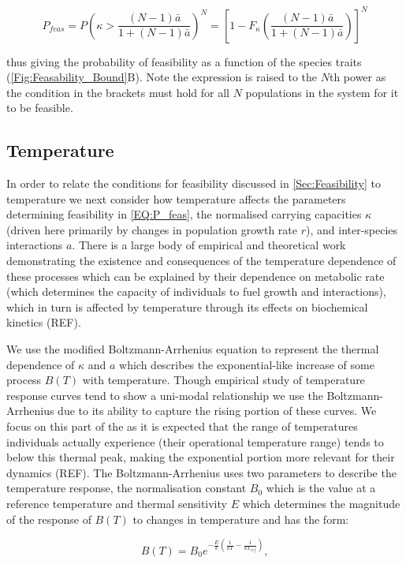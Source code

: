 \documentclass{article}
\begin{document}
\begin{equation} \label{EQ:P_feas}
    P_{feas} = P \left( \kappa > \frac{(N-1)\bar{a}}{1 + (N-1)\bar{a}}  \right)^N = 
    \left[1 - F_{\kappa}\left(\frac{(N-1)\bar{a}}{1 + (N-1)\bar{a}}\right)\right]^N
\end{equation}

thus giving the probability of feasibility as a function of the species traits (\cref{Fig:Feasability_Bound}B). Note the expression is raised to the $N$th power as the condition in the brackets must hold for all $N$ populations in the system for it to be feasible. 

\subsection{Temperature} \label{SEC:Temperature}
In order to relate the conditions for feasibility discussed in \cref{Sec:Feasibility} to temperature we next consider how temperature affects the parameters determining feasibility in \cref{EQ:P_feas}, the normalised carrying capacities $\kappa$ (driven here primarily by changes in population growth rate $r$), and inter-species interactions $a$. There is a large body of empirical and theoretical work demonstrating the existence and consequences of the temperature dependence of these processes which can be explained by their dependence on metabolic rate (which determines the capacity of individuals to fuel growth and interactions), which in turn is affected by temperature through its effects on biochemical kinetics (REF).

We use the modified Boltzmann-Arrhenius equation to represent the thermal dependence of $\kappa$ and $a$ which describes the exponential-like increase of some process $B(T)$ with temperature. Though empirical study of temperature response curves tend to show a uni-modal relationship we use the Boltzmann-Arrhenius due to its ability to capture the rising portion of these curves. We focus on this part of the  as it is expected that the range of temperatures individuals actually experience (their operational temperature range) tends to below this thermal peak, making the exponential portion more relevant for their dynamics (REF). The Boltzmann-Arrhenius uses two parameters to describe the temperature response, the normalisation constant $B_0$ which is the value at a reference temperature and thermal sensitivity $E$ which determines the magnitude of the response of $B(T)$ to changes in temperature and has the form:

\begin{equation} \label{EQ:Boltzmann}
    B(T) = B_0 e^{-\frac{E}{k} \left(\frac{1}{kT} - \frac{1}{k T_{ref} }\right)},
\end{equation}
\end{document}
